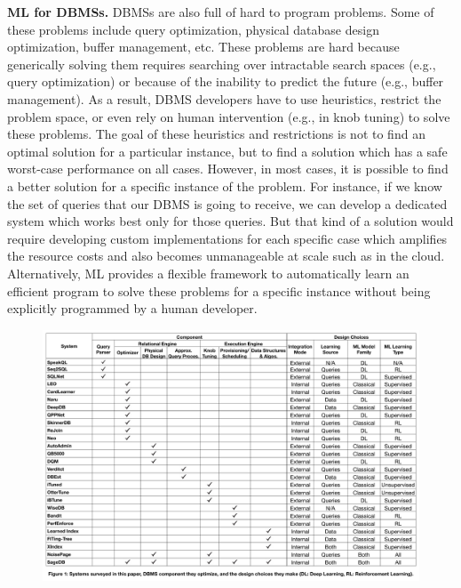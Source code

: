 \vspace{2mm}
\noindent \textbf{ML for DBMSs.} DBMSs are also full of hard to program problems.
Some of these problems include query optimization, physical database design optimization, buffer management, etc.
These problems are hard because generically solving them requires searching over intractable search spaces (e.g., query optimization) or because of the inability to predict the future (e.g., buffer management).
As a result, DBMS developers have to use heuristics, restrict the problem space, or even rely on human intervention (e.g., in knob tuning) to solve these problems.
The goal of these heuristics and restrictions is not to find an optimal solution for a particular instance, but to find a solution which has a safe worst-case performance on all cases.
However, in most cases, it is possible to find a better solution for a specific instance of the problem.
For instance, if we know the set of queries that our DBMS is going to receive, we can develop a dedicated system which works best only for those queries.
But that kind of a solution would require developing custom implementations for each specific case which amplifies the resource costs and also becomes unmanageable at scale such as in the cloud.
Alternatively, ML provides a flexible framework to automatically learn an efficient program to solve these problems for a specific instance without being explicitly programmed by a human developer.

\begin{figure}
    \centering
    \vspace{-6mm}
    \includegraphics[height=0.85\textwidth, angle=90]{images/taxonomy.pdf}
\end{figure}

